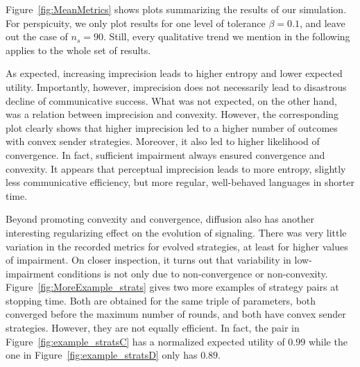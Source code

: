 \documentclass[fleqn,reqno,10pt]{article}
\begin{document}
Figure~\ref{fig:MeanMetrics} shows plots summarizing the results of
our simulation. For perspicuity, we only plot results for one level of
tolerance $\beta = 0.1$, and leave out the case of $n_s = 90$. Still,
every qualitative trend we mention in the following applies to the
whole set of results.

As expected, increasing imprecision leads to higher entropy and lower
expected utility. Importantly, however, imprecision does not
necessarily lead to disastrous decline of communicative success. What was
not expected, on the other hand, was a relation between imprecision and
convexity. However, the corresponding plot clearly shows that
higher imprecision led to a higher number of outcomes with
convex sender strategies. Moreover, it also led to higher likelihood of
convergence. In fact, sufficient impairment always ensured convergence
and convexity. It appears that perceptual imprecision leads to
more entropy, slightly less communicative efficiency, but more
regular, well-behaved languages in shorter time.

Beyond promoting convexity and convergence, diffusion also has another interesting
regularizing effect on the evolution of signaling. There was very
little variation in the recorded metrics for evolved strategies, at
least for higher values of impairment. On closer inspection, it turns
out that variability in low-impairment conditions is not only due to
non-convergence or non-convexity. Figure~\ref{fig:MoreExample_strats}
gives two more examples of strategy pairs at stopping time. Both are
obtained for the same triple of parameters, both converged before the
maximum number of rounds, and both have
convex sender strategies. However, they are not equally efficient. In
fact, the pair in Figure~\ref{fig:example_stratsC} has a normalized
expected utility of $0.99$ while the one in
Figure~\ref{fig:example_stratsD} only has $0.89$.
\end{document}
